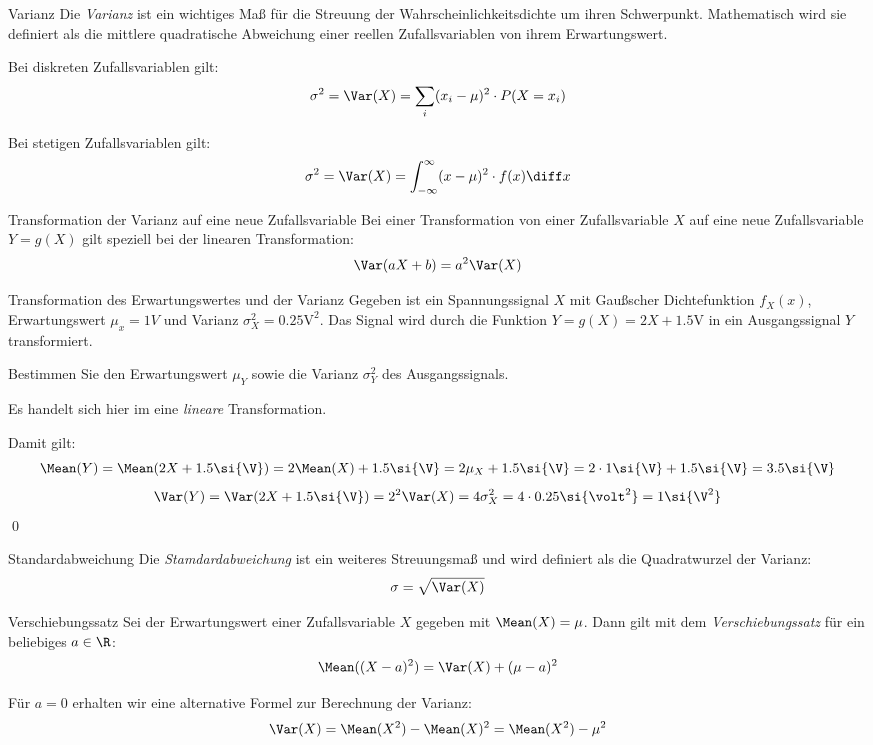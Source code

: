 \begin{defi}{Varianz}
    Die \emph{Varianz} ist ein wichtiges Maß für die Streuung der Wahrscheinlichkeitsdichte um ihren Schwerpunkt.
    Mathematisch wird sie definiert als die mittlere quadratische Abweichung einer reellen Zufallsvariablen von ihrem Erwartungswert.

    Bei diskreten Zufallsvariablen gilt:
    \[
        \sigma^2 = \Var(X) = \sum_i (x_i - \mu)^2 \cdot P(X = x_i)
    \]

    Bei stetigen Zufallsvariablen gilt:
    \[
        \sigma^2 = \Var(X) = \int_{-\infty}^{\infty} (x - \mu)^2 \cdot f(x) \diff x
    \]
\end{defi}

\begin{algo}{Transformation der Varianz auf eine neue Zufallsvariable}
    Bei einer Transformation von einer Zufallsvariable $X$ auf eine neue Zufallsvariable $Y = g(X)$ gilt speziell bei der linearen Transformation:
    \[
        \Var(aX + b) = a^2 \Var(X)
    \]
\end{algo}

\begin{example}{Transformation des Erwartungswertes und der Varianz}
    Gegeben ist ein Spannungssignal $X$ mit Gaußscher Dichtefunktion $f_X(x)$, Erwartungswert $\mu_x = 1\si{V}$ und Varianz $\sigma_X^2 = 0.25\si{\volt}^2$.
    Das Signal wird durch die Funktion $Y = g(X) = 2X + 1.5\si{\V}$ in ein Ausgangssignal $Y$ transformiert.

    Bestimmen Sie den Erwartungswert $\mu_Y$ sowie die Varianz $\sigma^2_Y$ des Ausgangssignals.

    \exampleseparator

    Es handelt sich hier im eine \emph{lineare} Transformation.

    Damit gilt:
    \[
        \Mean(Y) = \Mean(2X + 1.5\si{\V}) = 2\Mean(X) + 1.5\si{\V} = 2\mu_X + 1.5\si{\V} = 2 \cdot 1\si{\V} + 1.5\si{\V} = 3.5\si{\V}
    \]
    \[
        \Var(Y) = \Var(2X + 1.5\si{\V}) = 2^2 \Var(X) = 4 \sigma_X^2 = 4 \cdot 0.25\si{\volt^2} = 1\si{\V^2}
    \]
    \qed
\end{example}

\begin{defi}{Standardabweichung}
    Die \emph{Stamdardabweichung} ist ein weiteres Streuungsmaß und wird definiert als die Quadratwurzel der Varianz:
    \[
        \sigma = \sqrt{\Var(X)}
    \]
\end{defi}

\begin{algo}{Verschiebungssatz}
    Sei der Erwartungswert einer Zufallsvariable $X$ gegeben mit $\Mean(X) = \mu$.
    Dann gilt mit dem \emph{Verschiebungssatz} für ein beliebiges $a \in \R$:
    \[
        \Mean((X-a)^2) = \Var(X) + (\mu - a)^2
    \]

    Für $a = 0$ erhalten wir eine alternative Formel zur Berechnung der Varianz:
    \[
        \Var(X) = \Mean(X^2) -\Mean(X)^2 = \Mean(X^2) - \mu^2
    \]
\end{algo}

